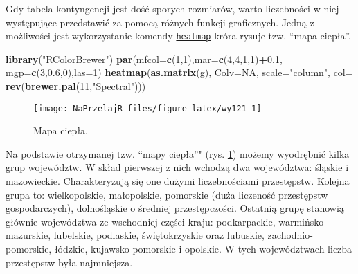 \documentclass[polish,]{book}
\newenvironment{Shaded}{\begin{snugshade}}{\end{snugshade}}
\newcommand{\DataTypeTok}[1]{\textcolor[rgb]{0.13,0.29,0.53}{#1}}
\newcommand{\DecValTok}[1]{\textcolor[rgb]{0.00,0.00,0.81}{#1}}
\newcommand{\FloatTok}[1]{\textcolor[rgb]{0.00,0.00,0.81}{#1}}
\newcommand{\KeywordTok}[1]{\textcolor[rgb]{0.13,0.29,0.53}{\textbf{#1}}}
\newcommand{\NormalTok}[1]{#1}
\newcommand{\OperatorTok}[1]{\textcolor[rgb]{0.81,0.36,0.00}{\textbf{#1}}}
\newcommand{\OtherTok}[1]{\textcolor[rgb]{0.56,0.35,0.01}{#1}}
\newcommand{\StringTok}[1]{\textcolor[rgb]{0.31,0.60,0.02}{#1}}
\begin{document}
Gdy tabela kontyngencji jest dość sporych rozmiarów, warto liczebności w niej występujące przedstawić za pomocą różnych funkcji graficznych. Jedną z możliwości
jest wykorzystanie komendy \href{https://rdrr.io/r/stats/heatmap.html}{\texttt{heatmap}} króra rysuje tzw. ``mapa ciepła''.

\begin{Shaded}
\begin{Highlighting}[]
\KeywordTok{library}\NormalTok{(}\StringTok{"RColorBrewer"}\NormalTok{)}
\KeywordTok{par}\NormalTok{(}\DataTypeTok{mfcol=}\KeywordTok{c}\NormalTok{(}\DecValTok{1}\NormalTok{,}\DecValTok{1}\NormalTok{),}\DataTypeTok{mar=}\KeywordTok{c}\NormalTok{(}\DecValTok{4}\NormalTok{,}\DecValTok{4}\NormalTok{,}\DecValTok{1}\NormalTok{,}\DecValTok{1}\NormalTok{)}\OperatorTok{+}\FloatTok{0.1}\NormalTok{,}
    \DataTypeTok{mgp=}\KeywordTok{c}\NormalTok{(}\DecValTok{3}\NormalTok{,}\FloatTok{0.6}\NormalTok{,}\DecValTok{0}\NormalTok{),}\DataTypeTok{las=}\DecValTok{1}\NormalTok{)}
\KeywordTok{heatmap}\NormalTok{(}\KeywordTok{as.matrix}\NormalTok{(g), }\DataTypeTok{Colv=}\OtherTok{NA}\NormalTok{, }\DataTypeTok{scale=}\StringTok{"column"}\NormalTok{,}
        \DataTypeTok{col=} \KeywordTok{rev}\NormalTok{(}\KeywordTok{brewer.pal}\NormalTok{(}\DecValTok{11}\NormalTok{,}\StringTok{"Spectral"}\NormalTok{)))}
\end{Highlighting}
\end{Shaded}

\begin{figure}[h]

{\centering \texttt{[image: NaPrzelajR\_files/figure-latex/wy121-1]} 

}

\caption{Mapa ciepła.}\label{fig:wy121}
\end{figure}

Na podstawie otrzymanej tzw. ``mapy ciepła''" (rys. \ref{fig:wy121}) możemy wyodrębnić
kilka grup województw. W skład pierwszej z nich wchodzą dwa województwa: śląskie
i mazowieckie. Charakteryzują się one dużymi liczebnościami przestępstw. Kolejna
grupa to: wielkopolskie, małopolskie, pomorskie (duża liczeność przestępstw gospodarczych), dolnośląskie o średniej przestępczości. Ostatnią grupę stanowią głównie województwa ze wschodniej części kraju: podkarpackie, warmińsko-mazurskie,
lubelskie, podlaskie, świętokrzyskie oraz lubuskie, zachodnio-pomorskie, łódzkie,
kujawsko-pomorskie i opolskie. W tych województwach liczba przestępstw była najmniejsza.
\end{document}
